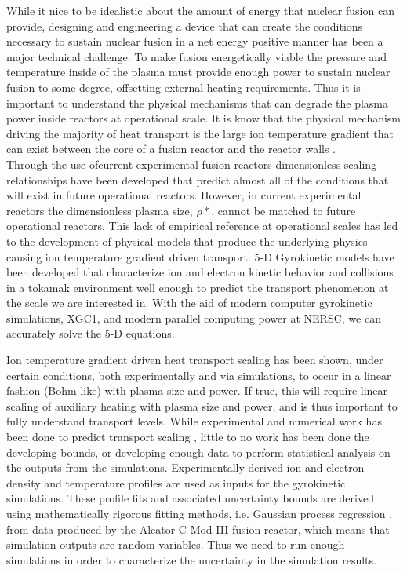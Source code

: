 \documentclass{article}
\begin{document}
While it nice to be idealistic about the amount of energy that nuclear fusion can provide, designing and engineering a device that can create the conditions necessary to sustain nuclear fusion in a net energy positive manner has been a major technical challenge. To make fusion energetically viable the pressure and temperature inside of the plasma must provide enough power to sustain nuclear fusion to some degree, offsetting external heating requirements. Thus it is important to understand the physical mechanisms that can degrade the plasma power inside reactors at operational scale. It is know that the physical mechanism driving the majority of heat transport is the large ion temperature gradient that can exist between the core of a fusion reactor and the reactor walls \cite{horton_drift_1999}.\\
Through the use ofcurrent experimental fusion reactors dimensionless scaling relationships have been developed that predict almost all of the conditions that will exist in future operational reactors. However, in current experimental reactors the dimensionless plasma size, $\rho*$, cannot be matched to future operational reactors.  This lack of empirical reference at operational scales has led to the development of physical models that produce the underlying physics causing ion temperature gradient driven transport. 5-D Gyrokinetic models have been developed that characterize ion and electron kinetic behavior and collisions in a tokamak environment well enough to predict the transport phenomenon at the scale we are interested in. With the aid of modern computer gyrokinetic simulations, XGC1, and modern parallel computing power at NERSC, we can accurately solve the 5-D equations. \\

\vspace{0.01cm}

Ion temperature gradient driven heat transport scaling has been shown, under certain conditions, both experimentally and via simulations, to occur in a linear fashion (Bohm-like) with plasma size and power. If true, this will require linear scaling of auxiliary heating with plasma size and power, and is thus important to fully understand transport levels. While experimental and numerical work has been done to predict transport scaling \cite{c.c._petty_et_al_gyroradius_1995}, little to no work has been done the developing bounds, or developing enough data to perform statistical analysis on the outputs from the simulations. Experimentally derived ion and electron density and temperature profiles are used as inputs for the gyrokinetic simulations. These profile fits and associated uncertainty bounds are derived using mathematically rigorous fitting methods, i.e. Gaussian process regression \cite{m.a._chilenski_et_al_improved_2015}, from data produced by the Alcator C-Mod III fusion reactor, which means that simulation outputs are random variables. Thus we need to run enough simulations in order to characterize the uncertainty in the simulation results.\\
\end{document}
